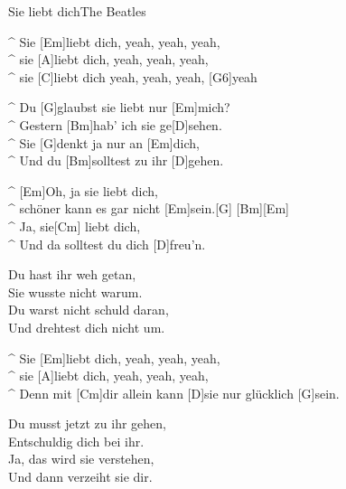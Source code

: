 \begin{song}{Sie liebt dich}{The Beatles}

\begin{guitar}
^ Sie [Em]liebt dich, yeah, yeah, yeah,\\
^ sie [A]liebt dich, yeah, yeah, yeah,\\
^ sie [C]liebt dich yeah, yeah, yeah, [G6]yeah\\
\end{guitar}

\begin{guitar}
^ Du [G]glaubst sie liebt nur [Em]mich? \\
^ Gestern [Bm]hab' ich sie ge[D]sehen. \\
^ Sie [G]denkt ja nur an [Em]dich, \\
^ Und du [Bm]solltest zu ihr [D]gehen. \\
\end{guitar}

\begin{guitar}
^ [Em]Oh, ja sie liebt dich,\\
^ schöner kann es gar nicht [Em]sein.[G]  [Bm][Em]\\
^ Ja, sie[Cm] liebt dich,\\
^ Und da solltest du dich [D]freu'n. \\
\end{guitar}

\begin{guitar}
Du hast ihr weh getan, \\
Sie wusste nicht warum. \\
Du warst nicht schuld daran, \\
Und drehtest dich nicht um. \\
\end{guitar}


\begin{guitar}
^ Sie [Em]liebt dich, yeah, yeah, yeah,\\
^ sie [A]liebt dich, yeah, yeah, yeah,\\
^ Denn mit [Cm]dir allein kann [D]sie nur glücklich [G]sein. \\
\end{guitar}

\begin{guitar}
Du musst jetzt zu ihr gehen, \\
Entschuldig dich bei ihr. \\
Ja, das wird sie verstehen, \\
Und dann verzeiht sie dir. \\
\end{guitar}

\end{song}

